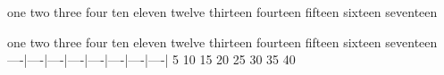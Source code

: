 one two three four  ten eleven twelve
thirteen fourteen fifteen sixteen
seventeen

one two three four  ten eleven twelve
thirteen fourteen fifteen sixteen
seventeen
----|----|----|----|----|----|----|----|
   5   10   15   20   25   30   35   40